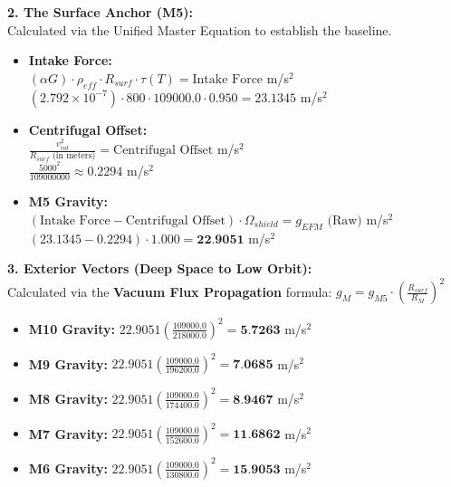 \documentclass[11pt, a4paper]{article}
\begin{document}
  \vspace{1.0em}
  \noindent \textbf{2. The Surface Anchor (M5):} \\
  \hspace*{1em} Calculated via the Unified Master Equation to establish the baseline.
  \begin{itemize}
    \item \textbf{Intake Force:} \\[0.5em]
    \hspace*{2em} $(\alpha G) \cdot \rho_{eff} \cdot R_{surf} \cdot \tau(T) = \text{Intake Force}$ m/s$^2$ \\[1em]
    \hspace*{2em} $(2.792 \times 10^{-7}) \cdot 800 \cdot 109000.0 \cdot 0.950 = 23.1345$ m/s$^2$
    
    \item \textbf{Centrifugal Offset:} \\[0.5em]
    \hspace*{2em} $\frac{v_{rot}^2}{R_{surf} \text{ (in meters)}} = \text{Centrifugal Offset}$ m/s$^2$ \\[1em]
    \hspace*{2em} $\frac{5000^2}{109000000} \approx 0.2294$ m/s$^2$
    
    \item \textbf{M5 Gravity:} \\[0.5em]
    \hspace*{2em} $(\text{Intake Force} - \text{Centrifugal Offset}) \cdot \Omega_{shield} = g_{EFM} \text{ (Raw)}$ m/s$^2$ \\[1em]
    \hspace*{2em} $(23.1345 - 0.2294) \cdot 1.000 = \textbf{22.9051}$ m/s$^2$
  \end{itemize}

  \clearpage
  \noindent \textbf{3. Exterior Vectors (Deep Space to Low Orbit):} \\
  \hspace*{1em} Calculated via the \textbf{Vacuum Flux Propagation} formula: $g_M = g_{M5} \cdot \left( \frac{R_{surf}}{R_M} \right)^2$
  \begin{itemize}
    \item \textbf{M10 Gravity:} $22.9051 \left( \frac{109000.0}{218000.0} \right)^2 = \textbf{5.7263}$ m/s$^2$
    \item \textbf{M9 Gravity:} $22.9051 \left( \frac{109000.0}{196200.0} \right)^2 = \textbf{7.0685}$ m/s$^2$
    \item \textbf{M8 Gravity:} $22.9051 \left( \frac{109000.0}{174400.0} \right)^2 = \textbf{8.9467}$ m/s$^2$
    \item \textbf{M7 Gravity:} $22.9051 \left( \frac{109000.0}{152600.0} \right)^2 = \textbf{11.6862}$ m/s$^2$
    \item \textbf{M6 Gravity:} $22.9051 \left( \frac{109000.0}{130800.0} \right)^2 = \textbf{15.9053}$ m/s$^2$
  \end{itemize}
\end{document}
